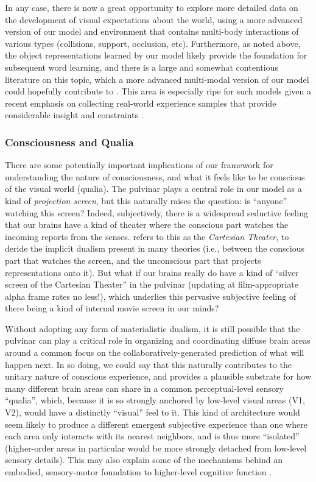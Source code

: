 \documentclass[11pt,twoside]{article}
\newif\myifpdf
\begin{document}
In any case, there is now a great opportunity to explore more detailed data on the development of visual expectations about the world, using a more advanced version of our model and environment that contains multi-body interactions of various types (collisions, support, occlusion, etc).  Furthermore, as noted above, the object representations learned by our model likely provide the foundation for subsequent word learning, and there is a large and somewhat contentious literature on this topic, which a more advanced multi-modal version of our model could hopefully contribute to \cite[e.g.,]{StevensGleitmanTrueswellEtAl17,YuSmith12,ColungaSmith05,WaxmanGelman09}.  This area is especially ripe for such models given a recent emphasis on collecting real-world experience samples that provide considerable insight and constraints \cite{YuSmith12,RoyFrankDeCampEtAl15,StevensGleitmanTrueswellEtAl17}.

\subsubsection{Consciousness and Qualia}

There are some potentially important implications of our framework for understanding the nature of consciousness, and what it feels like to be conscious of the visual world (qualia).  The pulvinar plays a central role in our model as a kind of {\em projection screen}, but this naturally raises the question: is ``anyone'' watching this screen?  Indeed, subjectively, there is a widespread seductive feeling that our brains have a kind of theater where the conscious part watches the incoming reports from the senses.  refers to this as the {\em Cartesian Theater}, to deride the implicit dualism present in many theories (i.e., between the conscious part that watches the screen, and the unconscious part that projects representations onto it).  But what if our brains really do have a kind of ``silver screen of the Cartesian Theater'' in the pulvinar (updating at film-appropriate alpha frame rates no less!), which underlies this pervasive subjective feeling of there being a kind of internal movie screen in our minds?

Without adopting any form of materialistic dualism, it is still possible that the pulvinar can play a critical role in organizing and coordinating diffuse brain areas around a common focus on the collaboratively-generated prediction of what will happen next.  In so doing, we could say that this naturally contributes to the unitary nature of conscious experience, and provides a plausible substrate for how many different brain areas can share in a common perceptual-level sensory ``qualia'', which, because it is so strongly anchored by low-level visual areas (V1, V2), would have a distinctly ``visual'' feel to it.  This kind of architecture would seem likely to produce a different emergent subjective experience than one where each area only interacts with its nearest neighbors, and is thus more ``isolated'' (higher-order areas in particular would be more strongly detached from low-level sensory details).  This may also explain some of the mechanisms behind an embodied, sensory-motor foundation to higher-level cognitive function \cite{Barsalou08,Barsalou09,Anderson03a}. 
\end{document}
